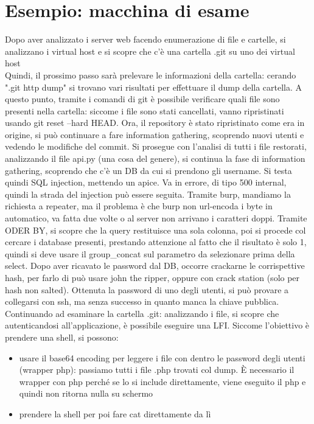 \documentclass{article}
\begin{document}
\section{Esempio: macchina di esame}
Dopo aver analizzato i server web facendo enumerazione di file e cartelle, si analizzano i virtual host e si scopre che c'è una cartella .git su uno dei virtual host\\ Quindi, il prossimo passo sarà prelevare le informazioni della cartella: cerando ".git http dump" si trovano vari risultati per effettuare il dump della cartella. A questo punto, tramite i comandi di git è possibile verificare quali file sono presenti nella cartella: siccome i file sono stati cancellati, vanno ripristinati usando git reset --hard HEAD. Ora, il repository è stato ripristinato come era in origine, si può continuare a fare information gathering, scoprendo nuovi utenti e vedendo le modifiche del commit. Si prosegue con l'analisi di tutti i file restorati, analizzando il file api.py (una cosa del genere), si continua la fase di information gathering, scoprendo che c'è un DB da cui si prendono gli username. Si testa quindi SQL injection, mettendo un apice. Va in errore, di tipo 500 internal, quindi la strada del injection può essere seguita. Tramite burp, mandiamo la richiesta a repeater, ma il problema è che burp non url-encoda i byte in automatico, va fatta due volte o al server non arrivano i caratteri doppi. Tramite ODER BY, si scopre che la query restituisce una sola colonna, poi si procede col cercare i database presenti, prestando attenzione al fatto che il risultato è solo 1, quindi si deve usare il group\_concat sul parametro da selezionare prima della select. Dopo aver ricavato le password dal DB, occorre crackarne le corrispettive hash, per farlo di può usare john the ripper, oppure con crack station (solo per hash non salted). Ottenuta la password di uno degli utenti, si può provare a collegarsi con ssh, ma senza successo in quanto manca la chiave pubblica. Continuando ad esaminare la cartella .git: analizzando i file, si scopre che autenticandosi all'applicazione, è possibile eseguire una LFI. Siccome l'obiettivo è prendere una shell, si possono:
\begin{itemize}
\item usare il base64 encoding per leggere i file con dentro le password degli utenti (wrapper php): passiamo tutti i file .php trovati col dump. È necessario il wrapper con php perché se lo si include direttamente, viene eseguito il php e quindi non ritorna nulla su schermo
\item prendere la shell per poi fare cat direttamente da lì
\end{itemize}
\end{document}
